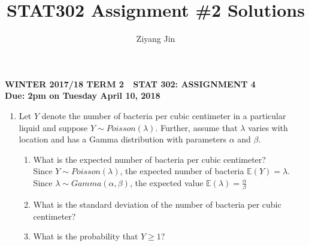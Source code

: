 \documentclass[11pt]{article}
\title{STAT302 Assignment \#2 Solutions}
\author{Ziyang Jin}
\newcommand{\e}{\mathbb{E}}
\begin{document}
\begin{center}
\textbf{WINTER 2017/18 TERM 2  \,\, STAT 302: ASSIGNMENT 4 \\
Due: 2pm on Tuesday April 10, 2018}
\end{center}


\begin{enumerate}[label=\textbf{Question \arabic*:},start=1]


\item
Let $Y$ denote the number of bacteria per cubic centimeter in a particular liquid and suppose $Y\sim Poisson(\lambda)$. Further, assume that $\lambda$ varies with location and has a Gamma distribution with parameters $\alpha$ and $\beta$.
\begin{enumerate}
	\item What is the expected number of bacteria per cubic centimeter?\\
	
	Since $Y \sim Poisson(\lambda)$, the expected number of bacteria $\e{(Y)} = \lambda$.\\
	Since $\lambda \sim Gamma(\alpha, \beta)$, the expected value $\e{(\lambda)} = \frac{\alpha}{\beta}$
	

	\item What is the standard deviation of the number of bacteria per cubic centimeter?\\

	\item What is the probability that $Y\geq 1$?\\

\end{enumerate}







\end{enumerate}
\end{document}
